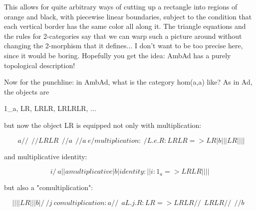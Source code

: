 This allows for quite arbitrary ways of cutting up a rectangle into
regions of orange and black, with piecewise linear boundaries, subject
to the condition that each vertical border has the same color all along
it.  The triangle equations and the rules for 2-categories say that we
can warp such a picture around without changing the 2-morphism that it
defines... I don't want to be too precise here, since it would be
boring.  Hopefully you get the idea: AmbAd has a purely topological 
description!  

Now for the punchline: in AmbAd, what is the category hom(a,a) like?
As in Ad, the objects are

1_{a}, LR, LRLR, LRLRLR, ...

but now the object LR is equipped not only with multiplication:


$$

                     \  \    a    /  /  
                      \  \       /  /
                       L  R     L  R
                        \  \   /  /
                  a      \  \ /  /      a      
                          \  e  /                     multiplication:
                           \   /                     L.e.R: LRLR => LR 
                           | b |
                           |   |
                           L   R
                           |   |
                           |   |   
$$
    
and multiplicative identity:


$$

                             i
                            / \
                    a      |   |    a                 multiplicative
                           | b |                         identity:
                           |   |                        i: 1_{a} => LR
                           L   R   
                           |   |
                           |   |

$$
    
but also a "comultiplication":
 

$$

                           |   |
                           |   |   
                           L   R
                           |   |
                           | b |
                           /   \                           
                          /  j  \                    comultiplication:
                  a      /  / \  \      a            L.j.R: LR => LRLR
                        /  /   \  \
                       L  R     L  R
                      /  /       \  \
                     /  /    b    \  \ 
$$
    
